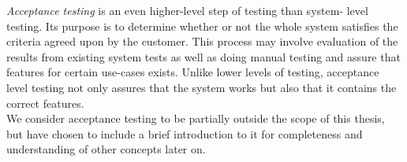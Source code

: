 
\emph{Acceptance testing} is an even higher-level step of testing than
system- level testing. Its purpose is to determine whether or not the
whole system satisfies the criteria agreed upon by the customer. This
process may involve evaluation of the results from existing system tests
as well as doing manual testing and assure that features for certain
use-cases exists. Unlike lower levels of testing, acceptance level
testing not only assures that the system works but also that it contains
the correct features. \cite{book:adp, wiki:acceptance}\\

We consider acceptance testing to be partially outside the scope of this
thesis, but have chosen to include a brief introduction to it for
completeness and understanding of other concepts later on.\\
